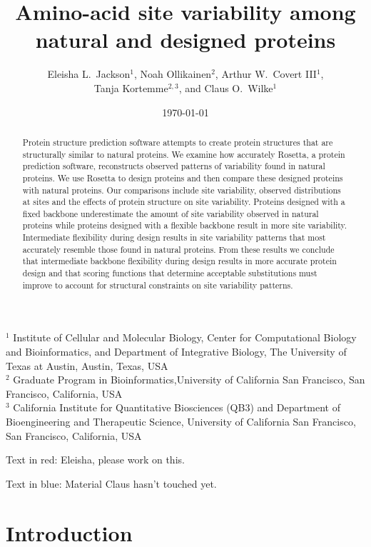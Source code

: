\documentclass[12pt]{article}
\title{Amino-acid site variability among natural and designed proteins}
\author{Eleisha L.\ Jackson$^1$, Noah Ollikainen$^2$, Arthur W.\ Covert III$^1$,\\ Tanja Kortemme$^{2,3}$, and Claus O.\ Wilke$^1$}
\begin{document}
\date{\today}
\maketitle

\noindent
$^1$ Institute of Cellular and Molecular Biology, Center for Computational Biology and Bioinformatics, and Department of Integrative Biology, The University of Texas at Austin, Austin, Texas, USA\\
$^2$ Graduate Program in Bioinformatics,University of California San Francisco, San Francisco, California, USA\\
$^3$ California Institute for Quantitative Biosciences (QB3) and Department of Bioengineering and Therapeutic Science, University of California San Francisco, San Francisco, California, USA

\bigskip

\noindent
{\color{red}Text in red: Eleisha, please work on this.}

\noindent
{\color{blue}Text in blue: Material Claus hasn't touched yet.}

\begin{abstract}
{\color{blue}
Protein structure prediction software attempts to create protein structures that are structurally similar to natural proteins. We examine how accurately Rosetta, a protein prediction software, reconstructs observed patterns of variability found in natural proteins. We use Rosetta to design proteins and then compare these designed proteins with natural proteins. Our comparisons include site variability, observed distributions at sites and the effects of protein structure on site variability. Proteins designed with a fixed backbone underestimate the amount of site variability observed in natural proteins while proteins designed with a flexible backbone result in more site variability. Intermediate flexibility during design results in site variability patterns that most accurately resemble those found in natural proteins. From these results we conclude that intermediate backbone flexibility during design results in more accurate protein design and that scoring functions that determine acceptable substitutions must improve to account for structural constraints on site variability patterns.
}
\end{abstract}


\section{Introduction}
\label{Introduction}
\end{document}
